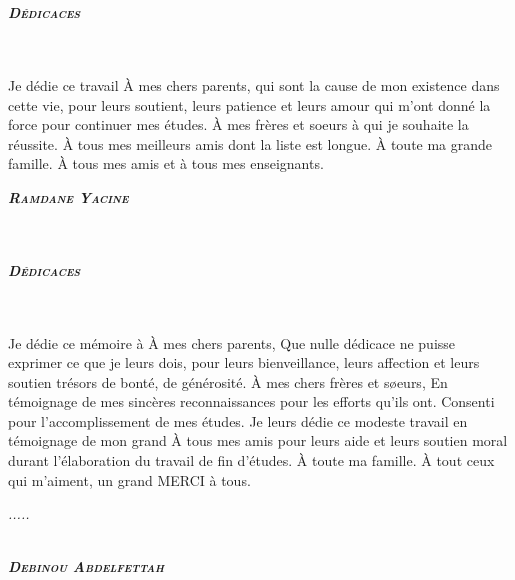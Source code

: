 \documentclass[french,a4,12pt]{report}
\begin{document}
\newpage
\thispagestyle{empty}
\clearpage
\newpage
{}
\begin{center}
\textbf{\\}
\textbf{\\}
\textbf{\huge \textsc{\itshape Dédicaces}}\\
\textbf{\\}
\textbf{\\}
\begin{flushleft}
\textsf{\qquad Je dédie ce travail 
À mes chers parents, qui sont la cause de mon existence dans cette vie, pour leurs soutient, leurs patience et leurs amour qui m'ont donné la force pour continuer mes études. À mes frères et soeurs à qui je souhaite la réussite. À tous mes meilleurs amis dont la liste est longue. À toute ma grande famille. À tous mes amis et à tous mes enseignants.
}\\
\end{flushleft}

\end{center}
\begin{flushright}
\textbf{\textsc{\itshape Ramdane Yacine}}
\end{flushright}
\newpage
\begin{center}
\textbf{\\}
\textbf{\\}
\textbf{\huge \textsc{\itshape Dédicaces}}\\
\textbf{\\}
\textbf{\\}

\begin{flushleft}
\textsf{\qquad Je dédie ce mémoire à 
À mes chers parents, Que nulle dédicace ne puisse exprimer ce que je leurs dois, pour leurs bienveillance, leurs affection et leurs soutien trésors de bonté, de générosité. À mes chers frères et søeurs, En témoignage de mes sincères reconnaissances pour les efforts qu'ils ont. Consenti pour l'accomplissement de mes études. Je leurs dédie ce modeste travail en témoignage de mon grand
À tous mes amis pour leurs aide et leurs soutien moral durant l'élaboration du travail de fin d'études. À toute ma famille. À tout ceux qui m'aiment, un grand MERCI à tous.}
\end{flushleft}

\normalsize{\itshape .....}
\textbf{\\}
\textbf{\\}
\end{center}
\begin{flushright}
\textbf{\textsc{\itshape Debinou Abdelfettah}}
\end{flushright}
\end{document}
